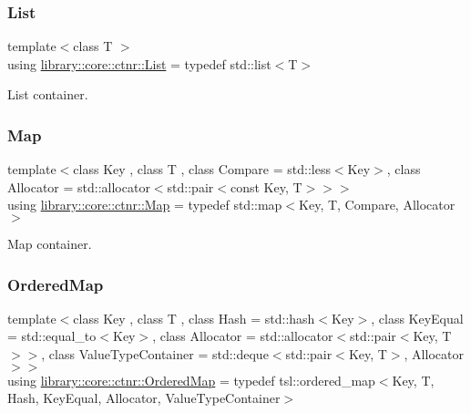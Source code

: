 \subsubsection{\texorpdfstring{List}{List}}
{\footnotesize\ttfamily template$<$class T $>$ \\
using \hyperlink{namespacelibrary_1_1core_1_1ctnr_a87ccf40619002299b341a5e76e989912}{library\+::core\+::ctnr\+::\+List} = typedef std\+::list$<$T$>$}



List container. 

\mbox{\label{namespacelibrary_1_1core_1_1ctnr_a248e088a0b4ec44aff451a5c3663dcee}} 
\subsubsection{\texorpdfstring{Map}{Map}}
{\footnotesize\ttfamily template$<$class Key , class T , class Compare  = std\+::less$<$\+Key$>$, class Allocator  = std\+::allocator$<$std\+::pair$<$const Key, T$>$$>$$>$ \\
using \hyperlink{namespacelibrary_1_1core_1_1ctnr_a248e088a0b4ec44aff451a5c3663dcee}{library\+::core\+::ctnr\+::\+Map} = typedef std\+::map$<$Key, T, Compare, Allocator$>$}



Map container. 

\mbox{\label{namespacelibrary_1_1core_1_1ctnr_a1c0809231c3bc9fccce602bd7941a36b}} 
\subsubsection{\texorpdfstring{Ordered\+Map}{OrderedMap}}
{\footnotesize\ttfamily template$<$class Key , class T , class Hash  = std\+::hash$<$\+Key$>$, class Key\+Equal  = std\+::equal\+\_\+to$<$\+Key$>$, class Allocator  = std\+::allocator$<$std\+::pair$<$\+Key, T$>$$>$, class Value\+Type\+Container  = std\+::deque$<$std\+::pair$<$\+Key, T$>$, Allocator$>$$>$ \\
using \hyperlink{namespacelibrary_1_1core_1_1ctnr_a1c0809231c3bc9fccce602bd7941a36b}{library\+::core\+::ctnr\+::\+Ordered\+Map} = typedef tsl\+::ordered\+\_\+map$<$Key, T, Hash, Key\+Equal, Allocator, Value\+Type\+Container$>$}



